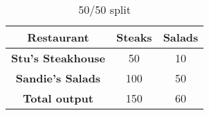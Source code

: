 \begin{table}[h!]
  \centering
    \begin{tabular}{|c|c|c|}
      \hline
      \textbf{Restaurant} & \textbf{Steaks} & \textbf{Salads} \\
      \hline
      \textbf{Stu's Steakhouse} & 50 & 10 \\
      \hline
      \textbf{Sandie's Salads} & 100 & 50 \\
      \hline
      \textbf{Total output} & 150 & 60 \\
      \hline
    \end{tabular}
    \caption{50/50 split}
    \label{tab:tab3}
  \end{table}

